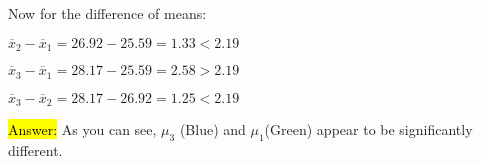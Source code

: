 \documentclass{article}
\begin{document}
\vspace{2mm}

Now for the difference of means:

\vspace{2mm}

$\overline{x}_{2}-\overline{x}_{1}=26.92-25.59=1.33<2.19$

\vspace{2mm}

$\overline{x}_{3}-\overline{x}_{1}=28.17-25.59=2.58>2.19$

\vspace{2mm}

$\overline{x}_{3}-\overline{x}_{2}=28.17-26.92=1.25<2.19$

\vspace{2mm}

\hl{Answer:} As you can see, $\mu_{3}$ (Blue) and $\mu_{1}$(Green) appear to be significantly different.
\end{document}
